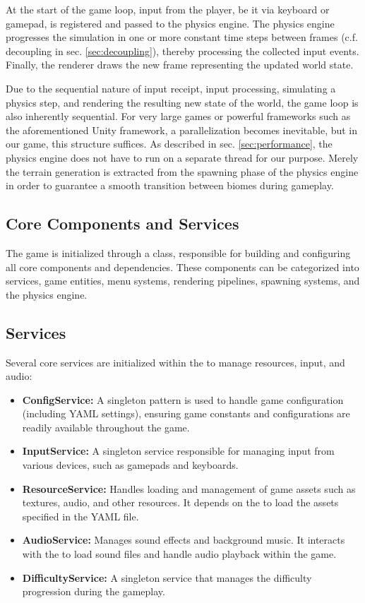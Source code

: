 At the start of the game loop, input from the player, be it via keyboard or gamepad, is registered and passed to the physics engine.
The physics engine progresses the simulation in one or more constant time steps between frames (c.f. decoupling in sec. \ref{sec:decoupling}), thereby processing the collected input events.
Finally, the renderer draws the new frame representing the updated world state.

Due to the sequential nature of input receipt, input processing, simulating a physics step, and rendering the resulting new state of the world, the game loop is also inherently sequential.
For very large games or powerful frameworks such as the aforementioned Unity framework, a parallelization becomes inevitable, but in our game, this structure suffices.
As described in sec. \ref{sec:performance}, the physics engine does not have to run on a separate thread for our purpose.
Merely the terrain generation is extracted from the spawning phase of the physics engine in order to guarantee a smooth transition between biomes during gameplay.

\subsection{Core Components and Services}

The game is initialized through a  class, responsible for building and configuring all core components and dependencies.
These components can be categorized into services, game entities, menu systems, rendering pipelines, spawning systems, and the physics engine.

\subsection{Services}
Several core services are initialized within the  to manage resources, input, and audio:

\begin{itemize}
    \item \textbf{ConfigService:} A singleton pattern is used to handle game configuration (including YAML settings), ensuring game constants and configurations are readily available throughout the game.
    \item \textbf{InputService:} A singleton service responsible for managing input from various devices, such as gamepads and keyboards.
    \item \textbf{ResourceService:} Handles loading and management of game assets such as textures, audio, and other resources. It depends on the  to load the assets specified in the YAML file.
    \item \textbf{AudioService:} Manages sound effects and background music. It interacts with the  to load sound files and handle audio playback within the game.
    \item \textbf{DifficultyService:} A singleton service that manages the difficulty progression during the gameplay.
\end{itemize}

